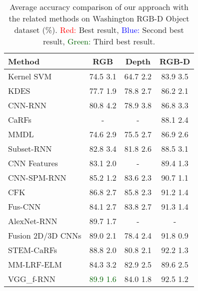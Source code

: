 \begin{table}[!h]
	\caption{Average accuracy comparison of our approach with the related methods on Washington RGB-D Object dataset (\%). \textcolor{red}{Red:} Best result, \textcolor{blue}{Blue:} Second best result, \textcolor{darkgreen}{Green:} Third best result.}
	\begin{center}
		\setlength{\tabcolsep}{0.9em} \def\arraystretch{1.1}
		\begin{adjustbox}{width=\columnwidth}
			\begin{tabular}{ lccc }
				\hline
				Method 											& RGB 							& Depth 						& RGB-D \\ \hline \hline
				Kernel SVM \citep{Lai_ICRA_2011}    				& 74.5  3.1 			& 64.7  2.2 	 		& 83.9  3.5			\\ KDES \citep{Bo_IROS_2011}         				& 77.7  1.9 			& 78.8  2.7 			& 86.2  2.1			\\ CNN-RNN \citep{Socher_NIPS_2012}    				& 80.8  4.2 			& 78.9  3.8			& 86.8  3.3			\\ CaRFs \citep{Asif_ICRA_2015}         			& - 			                & - 			                & 88.1  2.4			\\ MMDL \citep{Wang_2015_IEEE_ToM}         			& 74.6  2.9			& 75.5  2.7			& 86.9  2.6			\\ Subset-RNN \citep{Bai_Neurocomp_2015}  			& 82.8  3.4 			& 81.8  2.6 	 		& 88.5  3.1			\\ CNN Features \citep{Schwarz_ICRA_2015}  	        & 83.1  2.0 			& -								& 89.4  1.3			\\ CNN-SPM-RNN \citep{Cheng_CVIU_2015}        		& 85.2  1.2		 	& 83.6  2.3 			& 90.7  1.1			\\ CFK \citep{Cheng_3DV_2015}  						& 86.8  2.7 			& 85.8  2.3	        & 91.2  1.4			\\ Fus-CNN \citep{Eitel_IROS_2015}  	        	& 84.1  2.7 			& 83.8  2.7			& 91.3  1.4			\\ AlexNet-RNN \citep{Bui_Access_2016}  			& 89.7  1.7 			& -								& -								\\ Fusion 2D/3D CNNs \citep{Zia_ICCVW_2017}         & 89.0  2.1 			& 78.4  2.4			& 91.8  0.9			\\ STEM-CaRFs \citep{Asif_ToR_2017}  			    & 88.8  2.0 			& 80.8  2.1			& 92.2  1.3			\\
				MM-LRF-ELM \citep{Liu_Neurocomp_2018}        	& 84.3  3.2		 	& 82.9  2.5 			& 89.6  2.5			\\ VGG\_f-RNN \citep{Caglayan_ECCVW_2018}     		& \bftab\textcolor{darkgreen}{89.9  1.6} 	        & 84.0  1.8			& 92.5  1.2	        \\

\end{tabular}
\end{adjustbox}
\end{center}
\end{table}
